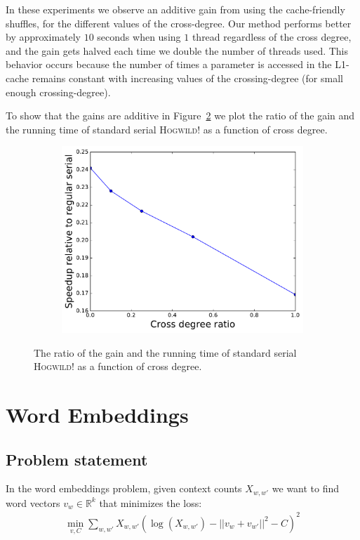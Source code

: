\documentclass[times,11pt]{article}
\numberwithin{equation}{section}		%
\numberwithin{figure}{section}			%
\numberwithin{table}{section}				%
\newcommand{\ltwonorm}[1]{\left|\left|{#1}\right|\right|}
\newcommand{\HW}{\textsc{Hogwild!}}
\begin{document}
In these experiments we observe an additive gain from using the cache-friendly shuffles, for the different values of the cross-degree. Our method performs better by approximately $10$ seconds when using $1$ thread regardless of the cross degree, and the gain gets halved each time we double the number of threads used. This behavior occurs because the number of times a parameter is accessed in the L1-cache remains constant with increasing values of the crossing-degree (for small enough crossing-degree). 


To show that the gains are additive in Figure~\ref{fig:crossratio} we plot the ratio of the gain and the running time of standard serial \HW{} as a function of cross degree.
\begin{figure}[h!]
\centering
    \begin{subfigure}[b]{0.49\columnwidth}
	\centerline{\includegraphics[width = 0.85\columnwidth, trim={0 0.1cm  0 0}, clip]{report_serial_cache_gains.pdf}}
      \caption{\scriptsize }
      \label{fig:crossratio}
    \end{subfigure}
  \caption{The ratio of the gain and the running time of standard serial \HW{} as a function of cross degree.}
\end{figure}


\section{Word Embeddings}\label{sec:w2v}

\subsection{Problem statement}
In the word embeddings problem, given context counts $X_{w,w'}$ we want to find word vectors
$v_{w} \in \mathbb{R}^{k}$ that minimizes the loss:
\begin{align*}
\min_{v,C}\sum_{w,w'}X_{w,w'} \left(\log(X_{w,w'}) - \ltwonorm{v_w+v_{w'}}^2 - C\right)^2
\end{align*}
\end{document}
